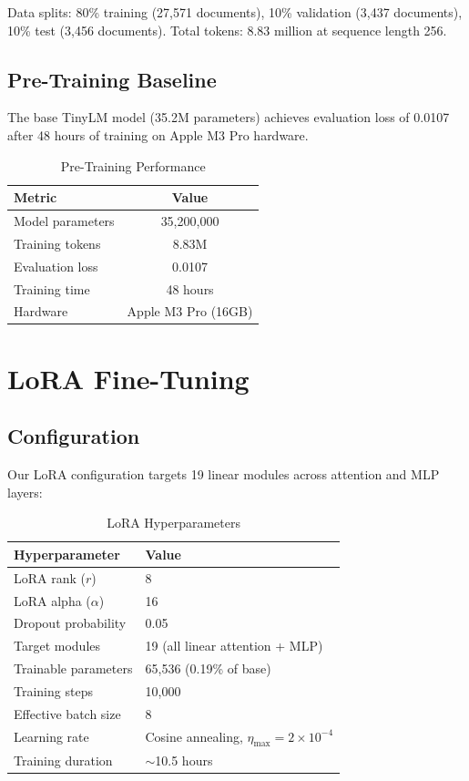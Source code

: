 \documentclass[11pt,a4paper]{article}
\theoremstyle{plain}
\theoremstyle{definition}
\begin{document}
Data splits: 80\% training (27,571 documents), 10\% validation
(3,437 documents), 10\% test (3,456 documents). Total tokens:
8.83 million at sequence length 256.

\subsection{Pre-Training Baseline}

The base TinyLM model (35.2M parameters) achieves evaluation loss
of 0.0107 after 48 hours of training on Apple M3 Pro hardware.

\begin{table}[H]
\centering
\caption{Pre-Training Performance}
\begin{tabular}{lc}
\toprule
\textbf{Metric} & \textbf{Value} \\
\midrule
Model parameters & 35,200,000 \\
Training tokens & 8.83M \\
Evaluation loss & 0.0107 \\
Training time & 48 hours \\
Hardware & Apple M3 Pro (16GB) \\
\bottomrule
\end{tabular}
\end{table}

\section{LoRA Fine-Tuning}

\subsection{Configuration}

Our LoRA configuration targets 19 linear modules across attention
and MLP layers:

\begin{table}[H]
\centering
\caption{LoRA Hyperparameters}
\begin{tabular}{ll}
\toprule
\textbf{Hyperparameter} & \textbf{Value} \\
\midrule
LoRA rank ($r$) & 8 \\
LoRA alpha ($\alpha$) & 16 \\
Dropout probability & 0.05 \\
Target modules & 19 (all linear attention + MLP) \\
Trainable parameters & 65,536 (0.19\% of base) \\
Training steps & 10,000 \\
Effective batch size & 8 \\
Learning rate & Cosine annealing, $\eta_{\max} = 2 \times 10^{-4}$ \\
Training duration & $\sim$10.5 hours \\
\bottomrule
\end{tabular}
\end{table}
\end{document}
